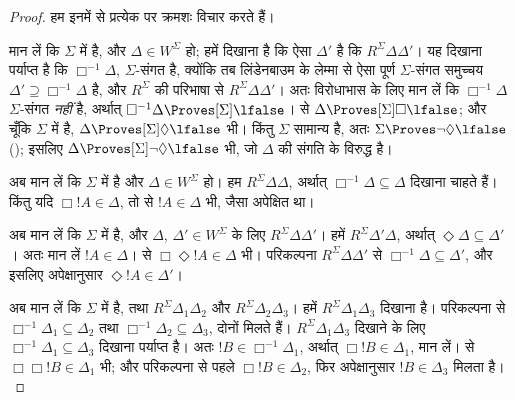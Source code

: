 \documentclass[../../../include/open-logic-section]{subfiles}
\begin{document}
\begin{proof}
  हम इनमें से प्रत्येक पर क्रमशः विचार करते हैं।

  मान लें कि $\Sigma$ में  है, और $\Delta \in W^\Sigma$ हो; हमें
  दिखाना है कि ऐसा $\Delta'$ है कि $R^\Sigma \Delta\Delta'$। यह दिखाना
  पर्याप्त है कि $\Box^{-1}\Delta$, $\Sigma$-संगत है, क्योंकि तब
  लिंडेनबाउम के लेम्मा से ऐसा पूर्ण $\Sigma$-संगत समुच्चय $\Delta'
  \supseteq \Box^{-1}\Delta$ है, और $R^\Sigma$ की परिभाषा
  से $R^\Sigma
  \Delta\Delta'$। अतः विरोधाभास के लिए मान लें कि $\Box^{-1}\Delta$
  $\Sigma$-संगत \emph{नहीं} है, अर्थात् $\Box^{-1}\Delta
  \Proves[\Sigma] \lfalse$।  से $\Delta
  \Proves[\Sigma] \Box\lfalse$; और चूँकि $\Sigma$ में  है,
  $\Delta \Proves[\Sigma] \Diamond\lfalse$ भी। किंतु $\Sigma$ सामान्य
  है, अतः $\Sigma \Proves \lnot\Diamond \lfalse$
  (); इसलिए $\Delta \Proves[\Sigma]
  \lnot\Diamond \lfalse$ भी, जो $\Delta$ की संगति के विरुद्ध है।

  अब मान लें कि $\Sigma$ में  है और $\Delta \in W^\Sigma$ हो। हम
  $R^\Sigma \Delta\Delta$, अर्थात् $\Box^{-1}\Delta \subseteq
  \Delta$ दिखाना चाहते हैं। किंतु यदि $\Box!A \in \Delta$, तो 
  से $!A \in \Delta$ भी, जैसा अपेक्षित था।

  अब मान लें कि $\Sigma$ में  है, और $\Delta$, $\Delta' \in
  W^\Sigma$ के लिए $R^\Sigma \Delta\Delta'$। हमें $R^\Sigma
  \Delta'\Delta$, अर्थात् $\Diamond\Delta \subseteq \Delta'$। अतः मान लें $!A \in
  \Delta$।  से $\Box\Diamond!A \in \Delta$ भी। परिकल्पना
  $R^\Sigma \Delta\Delta'$ से $\Box^{-1}\Delta \subseteq
  \Delta'$, और इसलिए अपेक्षानुसार $\Diamond!A \in \Delta'$।

  अब मान लें कि $\Sigma$ में  है, तथा $R^\Sigma
  \Delta_1\Delta_2$ और $R^\Sigma \Delta_2\Delta_3$। हमें $R^\Sigma
  \Delta_1\Delta_3$ दिखाना है। परिकल्पना से $\Box^{-1}\Delta_1 \subseteq
  \Delta_2$ तथा $\Box^{-1}\Delta_2 \subseteq \Delta_3$, दोनों मिलते
  हैं। $R^\Sigma \Delta_1\Delta_3$ दिखाने के लिए $\Box^{-1}\Delta_1
  \subseteq \Delta_3$ दिखाना पर्याप्त है। अतः $!B \in
  \Box^{-1}\Delta_1$, अर्थात् $\Box!B \in \Delta_1$, मान लें। 
  से $\Box\Box!B \in \Delta_1$ भी; और परिकल्पना से पहले $\Box!B \in
  \Delta_2$, फिर अपेक्षानुसार $!B \in \Delta_3$ मिलता है।


\end{proof}
\end{document}
